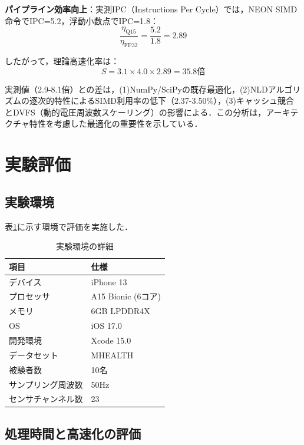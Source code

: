 \documentclass[paper]{ieice}
\begin{document}
\textbf{パイプライン効率向上}：実測IPC（Instructions Per Cycle）では，NEON SIMD命令でIPC=5.2，浮動小数点でIPC=1.8\cite{anandtech2021}：
\begin{equation}
\frac{\eta_{\text{Q15}}}{\eta_{\text{FP32}}} = \frac{5.2}{1.8} = 2.89
\end{equation}

したがって，理論高速化率は：
\begin{equation}
S = 3.1 \times 4.0 \times 2.89 = 35.8\text{倍}
\end{equation}

実測値（2.9-8.1倍）との差は，(1)NumPy/SciPyの既存最適化，(2)NLDアルゴリズムの逐次的特性によるSIMD利用率の低下（2.37-3.50\%），(3)キャッシュ競合とDVFS（動的電圧周波数スケーリング）の影響による．この分析は，アーキテクチャ特性を考慮した最適化の重要性を示している．

\section{実験評価}

\subsection{実験環境}

表\ref{tab:environment}に示す環境で評価を実施した．

\begin{table}[t]
\caption{実験環境の詳細}
\label{tab:environment}
\centering
\begin{tabular}{ll}
\toprule
項目 & 仕様 \\
\midrule
デバイス & iPhone 13 \\
プロセッサ & A15 Bionic (6コア) \\
メモリ & 6GB LPDDR4X \\
OS & iOS 17.0 \\
開発環境 & Xcode 15.0 \\
データセット & MHEALTH\cite{banos2014} \\
被験者数 & 10名 \\
サンプリング周波数 & 50Hz \\
センサチャンネル数 & 23 \\
\bottomrule
\end{tabular}
\end{table}

\subsection{処理時間と高速化の評価}
\end{document}
